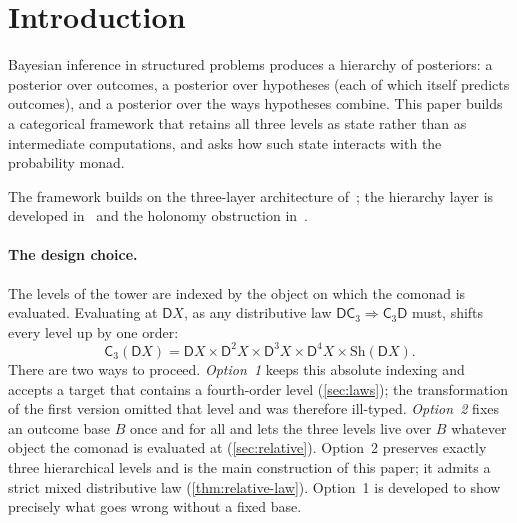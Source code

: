 \documentclass[11pt]{article}
\theoremstyle{definition}
\theoremstyle{remark}
\newcommand{\D}{\mathsf{D}}
\newcommand{\Sh}{\mathrm{Sh}}
\newcommand{\C}{\mathsf{C}}
\begin{document}
\tableofcontents

\section{Introduction}

Bayesian inference in structured problems produces a hierarchy of posteriors: a posterior over
outcomes, a posterior over hypotheses (each of which itself predicts outcomes), and a posterior over
the ways hypotheses combine. This paper builds a categorical framework that retains all three levels
as state rather than as intermediate computations, and asks how such state interacts with the
probability monad.

The framework builds on the three-layer architecture of~\cite{Awasthi-ThreeLayers}; the hierarchy
layer is developed in~\cite{Awasthi-Hierarchy} and the holonomy obstruction
in~\cite{Awasthi-Holonomy}.

\paragraph{The design choice.} The levels of the tower are indexed by the object on which the
comonad is evaluated. Evaluating at $\D X$, as any distributive law $\D\C_3\Rightarrow\C_3\D$ must,
shifts every level up by one order:
\[
\C_3(\D X)=\D X\times\D^2X\times\D^3X\times\D^4X\times\Sh(\D X).
\]
There are two ways to proceed. \emph{Option~1} keeps this absolute indexing and accepts a target that
contains a fourth-order level (\cref{sec:laws}); the transformation of the first version omitted that
level and was therefore ill-typed. \emph{Option~2} fixes an outcome base $B$ once and for all and lets
the three levels live over $B$ whatever object the comonad is evaluated at (\cref{sec:relative}).
Option~2 preserves exactly three hierarchical levels and is the main construction of this paper; it
admits a strict mixed distributive law (\cref{thm:relative-law}). Option~1 is developed to show
precisely what goes wrong without a fixed base.
\end{document}
